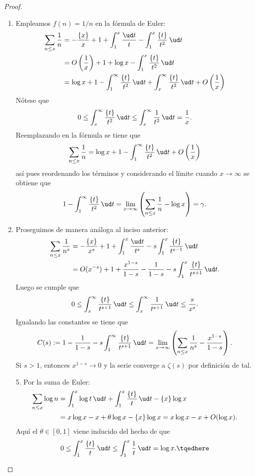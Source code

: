 \documentclass[teoria-numeros.tex]{subfiles}
\begin{document}
\begin{proof}
	\begin{enumerate}
		\item Empleamos $f(n) = 1/n$ en la fórmula de Euler:
			\begin{align*}
				\sum_{n \le x} \frac{1}{n} &= -\frac{\{x\}}{x} + 1 + \int_1^x \frac{\ud t}{t} - \int_{1}^{x} \frac{\{t\}}{t^2} \, \ud t \\
				&= O\left( \frac{1}{x} \right) + 1 + \log x - \int_{1}^{x} \frac{\{t\}}{t^2} \, \ud t \\
				&= \log x + 1 - \int_{1}^{\infty} \frac{ \{t\} }{t^2} \, \ud t + \int_{x}^{\infty} \frac{ \{t\} }{t^2} \, \ud t
				+ O\left( \frac{1}{x} \right)
			\end{align*}
			Nótese que
			$$ 0 \le \int_{x}^{\infty} \frac{ \{t\} }{t^2} \, \ud t \le \int_{x}^{\infty} \frac{1}{t^2} \, \ud t = \frac{1}{x}. $$
			Reemplazando en la fórmula se tiene que
			$$ \sum_{n\le x} \frac{1}{n} = \log x + 1 - \int_{1}^{\infty} \frac{ \{t\} }{t^2} \, \ud t + O\left( \frac{1}{x} \right) $$
			así pues reordenando los términos y considerando el límite cuando $x \to \infty$ se obtiene que
			$$ 1 - \int_{1}^{\infty} \frac{ \{t\} }{t^2} \, \ud t = \lim_{x\to\infty} \left( \sum_{n\le x} \frac{1}{n} - \log x \right) = \gamma. $$

		\item Proseguimos de manera análoga al inciso anterior:
			\begin{align*}
				\sum_{n\le x} \frac{1}{n^s} &= -\frac{\{x\}}{x^s} + 1 + \int_{1}^{x} \frac{\ud t}{t^s}
				- s\int_{1}^{x} \frac{\{t\}}{t^{s-1}} \, \ud t \\
				&= O(x^{-s}) + 1 + \frac{x^{1-s}}{1-s} - \frac{1}{1-s} - s \int_{1}^{x} \frac{\{t\}}{t^{s+1}} \, \ud t.
			\end{align*}
			Luego se cumple que
			$$ 0 \le \int_{x}^{\infty} \frac{\{t\}}{t^{s+1}} \, \ud t \le \int_{x}^{\infty} \frac{1}{t^{s+1}} \, \ud t \le \frac{s}{x^s}. $$
			Igualando las constantes se tiene que
			$$ C(s) := 1 - \frac{1}{1-s} - s\int_{1}^{\infty} \frac{\{t\}}{t^{s+1}} \, \ud t
			= \lim_{x\to\infty} \left( \sum_{n\le x} \frac{1}{n^s} - \frac{x^{1-s}}{1-s} \right). $$
			Si $s > 1$, entonces $x^{1 - s} \to 0$ y la serie converge a $\zeta(s)$ por definición de tal.

		\item[5.] Por la suma de Euler:
			\begin{align*}
				\sum_{n\le x} \log n &= \int_{1}^{x} \log t \, \ud t + \int_{1}^{x} \frac{\{t\}}{t} \, \ud t - \{x\}\log x \\
				&= x\log x - x + \theta \log x - \{x\}\log x = x\log x - x + O(\log x).
			\end{align*}
			Aquí el $\theta \in [0, 1]$ viene inducido del hecho de que
			\begin{equation}
				0 \le \int_{1}^{x} \frac{\{t\}}{t} \, \ud t \le \int_{1}^{x} \frac{1}{t} \, \ud t = \log x.
				\tqedhere
			\end{equation}
	\end{enumerate}
\end{proof}
\end{document}
